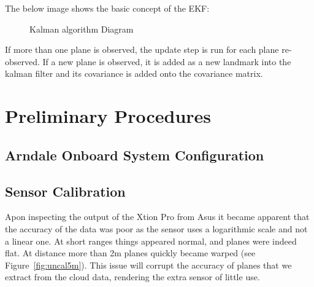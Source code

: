 \documentclass[]{article}
\begin{document}
{The below image shows the basic concept of the EKF:
\begin{figure}[H]
\centering     %
{} \;
\caption{Kalman algorithm Diagram}
\end{figure}

If more than one plane is observed, the update step is run for each plane re-observed. If a new plane is observed, it is added as a new landmark into the kalman filter and its covariance is added onto the covariance matrix.

\section{Preliminary Procedures}

\subsection{Arndale Onboard System Configuration}

\subsection{Sensor Calibration} %
Apon inspecting the output of the Xtion Pro from Asus it became apparent that the accuracy of the data was poor as the sensor uses a logarithmic scale and not a linear one. At short ranges things appeared normal, and planes were indeed flat. At distance more than 2m planes quickly became warped (see Figure~\ref{fig:uncal5m}). This issue will corrupt the accuracy of planes that we extract from the cloud data, rendering the extra sensor of little use. 

}
\end{document}
